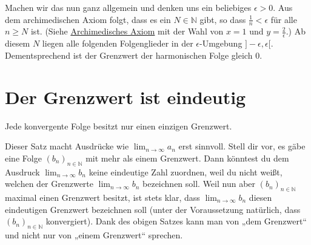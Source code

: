 \documentclass[fontsize=9pt,
               parskip=half-,
               DIV=14,
               listof=chapterentry,
               tocflat]{scrbook}
\begin{document}
Machen wir das nun ganz allgemein und denken uns ein beliebiges $\epsilon >0$. Aus dem archimedischen Axiom folgt, dass es ein $N\in \mathbb {N} $ gibt, so dass ${\tfrac {1}{n}}<\epsilon $ für alle $n\geq N$ ist. (Siehe \href{https://de.wikibooks.org/wiki/Mathe\_für\_Nicht-Freaks:\_Reelle\_Zahlen}
{Archimedisches Axiom} mit der Wahl von $x=1$ und $y={\frac {2}{\epsilon }}$.) Ab diesem $N$ liegen alle folgenden Folgenglieder in der $\epsilon $-Umgebung $]-\epsilon ,\epsilon [$. Dementsprechend ist der Grenzwert der harmonischen Folge gleich $0$.

\section{Der Grenzwert ist eindeutig}

\begin{theorem*}
Jede konvergente Folge besitzt nur einen einzigen Grenzwert.

\end{theorem*}

\begin{explanation*}
Dieser Satz macht Ausdrücke wie $\lim _{n\to \infty }a_{n}$ erst sinnvoll. Stell dir vor, es gäbe eine Folge $\left(b_{n}\right)_{n\in \mathbb {N} }$ mit mehr als einem Grenzwert. Dann könntest du dem Ausdruck $\lim _{n\to \infty }b_{n}$ keine eindeutige Zahl zuordnen, weil du nicht weißt, welchen der Grenzwerte $\lim _{n\rightarrow \infty }b_{n}$ bezeichnen soll. Weil nun aber $\left(b_{n}\right)_{n\in \mathbb {N} }$ maximal einen Grenzwert besitzt, ist stets klar, dass $\lim _{n\to \infty }b_{n}$ diesen eindeutigen Grenzwert bezeichnen soll (unter der Voraussetzung natürlich, dass $\left(b_{n}\right)_{n\in \mathbb {N} }$ konvergiert). Dank des obigen Satzes kann man von „dem Grenzwert“ und nicht nur von „einem Grenzwert“ sprechen.

\end{explanation*}
\end{document}
